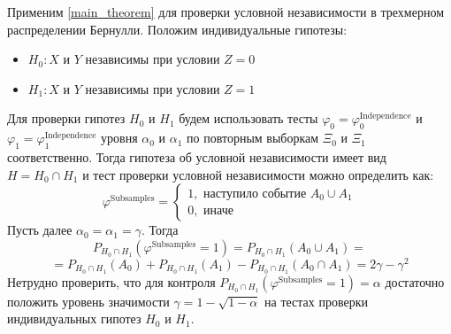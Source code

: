 Применим \autoref{main_theorem} для проверки условной независимости в трехмерном
распределении Бернулли.
Положим индивидуальные гипотезы:
\begin{itemize}
    \item $H_0 : X$ и $Y$ независимы при условии $Z=0$
    \item $H_1 : X$ и $Y$ независимы при условии $Z=1$
\end{itemize}
Для проверки гипотез $H_0$ и $H_1$ будем использовать тесты
$\varphi_0 = \varphi^{\text{Independence}}_0$ и 
$\varphi_1 = \varphi^{\text{Independence}}_1$ уровня $\alpha_0$ и $\alpha_1$ 
по повторным выборкам
$\Xi_0$ и $\Xi_1$ соответственно.
Тогда гипотеза
об условной независимости имеет вид $H = H_0 \cap H_1$ и тест проверки условной независимости можно определить как:
$$
\varphi^{\text{Subsamples}}=\begin{cases}
    1, \text{ наступило событие $A_0 \cup A_1$}\\
    0, \text{ иначе}
\end{cases}
$$
Пусть далее $\alpha_0 = \alpha_1 = \gamma$.
Тогда $$P_{H_0\cap H_1}(\varphi^{\text{Subsamples}}=1)=P_{H_0\cap H_1}(A_0 \cup A_1)=$$ 
$$ = P_{H_0\cap H_1}(A_0) + P_{H_0\cap H_1}(A_1) - 
P_{H_0\cap H_1}(A_0 \cap A_1) = 2\gamma - \gamma^2$$
Нетрудно проверить, что для контроля $P_{H_0\cap H_1}(\varphi^{\text{Subsamples}}=1)=\alpha$ достаточно положить
уровень значимости $\gamma = 1 - \sqrt{1-\alpha}$ на
тестах проверки индивидуальных гипотез $H_0$ и $H_1$.

